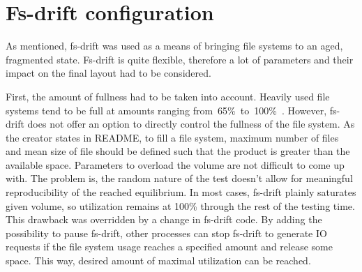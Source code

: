 \documentclass[
  color, %
  table, %
  lof,   %
  lot,   %
]{fithesis3}
\begin{document}
\section{Fs-drift configuration}
As mentioned, fs-drift was used as a means of bringing file systems to an aged, fragmented state. Fs-drift is quite flexible, therefore a lot of parameters and their impact on the final layout had to be considered.

First, the amount of fullness had to be taken into account. Heavily used file systems tend to be full at amounts ranging from~65\%~to~100\%~\cite{agrawal2007five,Smith:1997:FSA:258623.258689}. However, fs-drift does not offer an option to directly control the fullness of the file system. As the creator states in README, to fill a file system, maximum number of files and mean size of file should be defined such that the product is greater than the available space. Parameters to overload the volume are not difficult to come up with. The problem is, the random nature of the test doesn't allow for meaningful reproducibility of the reached equilibrium. In most cases, fs-drift plainly saturates given volume, so utilization remains at 100\% through the rest of the testing time. This drawback was overridden by a change in fs-drift code\footnotemark[1]. By adding the possibility to pause fs-drift, other processes can stop fs-drift to generate IO requests if the file system usage reaches a specified amount and release some space. This way, desired amount of maximal utilization can be reached.








\end{document}
